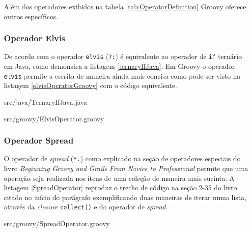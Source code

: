 \documentclass[12pt]{article}
\begin{document}
    Além dos operadores exibidos na tabela \ref{tab:OperatorDefinition} Groovy 
    oferece outros específicos.

\subsubsection{Operador Elvis}

    De acordo com \cite{beginingGroovy:2008} o operador \texttt{elvis} (\texttt{?:}) é equivalente
    ao operador de \texttt{if} ternário em Java, como demonstra a listagem \ref{ternaryIfJava}.
    Em Groovy o operador \texttt{elvis} permite a escrita de maneira ainda mais concisa 
    como pode ser visto na listagem \ref{elvisOperatorGroovy} com o código equivalente.
    
    
                    {src/java/TernaryIfJava.java}
    
    
                    {src/groovy/ElvisOperator.groovy}
                    
\subsubsection{Operador Spread}

    O operador de \emph{spread} (\texttt{*.}) como explicado na seção de operadores
    especiais do livro \emph{Beginning Groovy and Grails From Novice to Professional}
    \cite{beginingGroovy:2008} permite que uma operação seja realizada nos itens 
    de uma coleção de maneira mais sucinta. A listagem \ref{SpreadOperator} 
    reproduz o trecho de código na seção 2-35 do livro citado no início do parágrafo 
    exemplificando duas maneiras de iterar numa lista, através da \emph{closure} 
    \texttt{collect()} e do operador de \emph{spread}.
    
    
                    {src/groovy/SpreadOperator.groovy}
\end{document}
